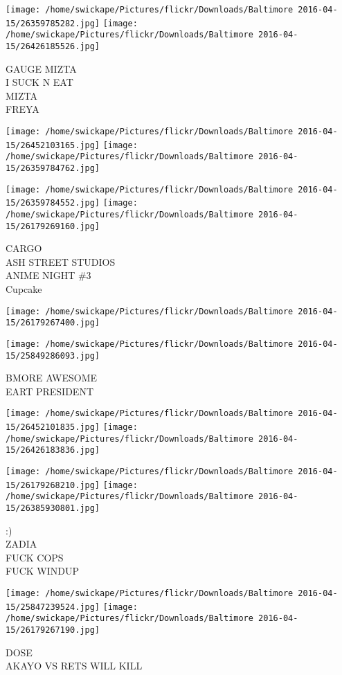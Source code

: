 \documentclass[10pt,letterpaper]{article}
\begin{document}
\texttt{[image: /home/swickape/Pictures/flickr/Downloads/Baltimore 2016-04-15/26359785282.jpg]}
\texttt{[image: /home/swickape/Pictures/flickr/Downloads/Baltimore 2016-04-15/26426185526.jpg]}

GAUGE MIZTA\\
I SUCK N EAT\\
MIZTA\\
FREYA\\
\pagebreak

\texttt{[image: /home/swickape/Pictures/flickr/Downloads/Baltimore 2016-04-15/26452103165.jpg]}
\texttt{[image: /home/swickape/Pictures/flickr/Downloads/Baltimore 2016-04-15/26359784762.jpg]}

\texttt{[image: /home/swickape/Pictures/flickr/Downloads/Baltimore 2016-04-15/26359784552.jpg]}
\texttt{[image: /home/swickape/Pictures/flickr/Downloads/Baltimore 2016-04-15/26179269160.jpg]}

CARGO\\
ASH STREET STUDIOS\\
ANIME NIGHT \#3\\
Cupcake\\
\pagebreak

\texttt{[image: /home/swickape/Pictures/flickr/Downloads/Baltimore 2016-04-15/26179267400.jpg]}

\vspace{0.25in}
\texttt{[image: /home/swickape/Pictures/flickr/Downloads/Baltimore 2016-04-15/25849286093.jpg]}

BMORE AWESOME\\
EART PRESIDENT\\
\pagebreak

\texttt{[image: /home/swickape/Pictures/flickr/Downloads/Baltimore 2016-04-15/26452101835.jpg]}
\texttt{[image: /home/swickape/Pictures/flickr/Downloads/Baltimore 2016-04-15/26426183836.jpg]}

\texttt{[image: /home/swickape/Pictures/flickr/Downloads/Baltimore 2016-04-15/26179268210.jpg]}
\texttt{[image: /home/swickape/Pictures/flickr/Downloads/Baltimore 2016-04-15/26385930801.jpg]}

:)\\
ZADIA\\
FUCK COPS\\
FUCK WINDUP\\
\pagebreak

\texttt{[image: /home/swickape/Pictures/flickr/Downloads/Baltimore 2016-04-15/25847239524.jpg]}
\texttt{[image: /home/swickape/Pictures/flickr/Downloads/Baltimore 2016-04-15/26179267190.jpg]}

DOSE\\
AKAYO VS RETS WILL KILL\\
\pagebreak
\end{document}
